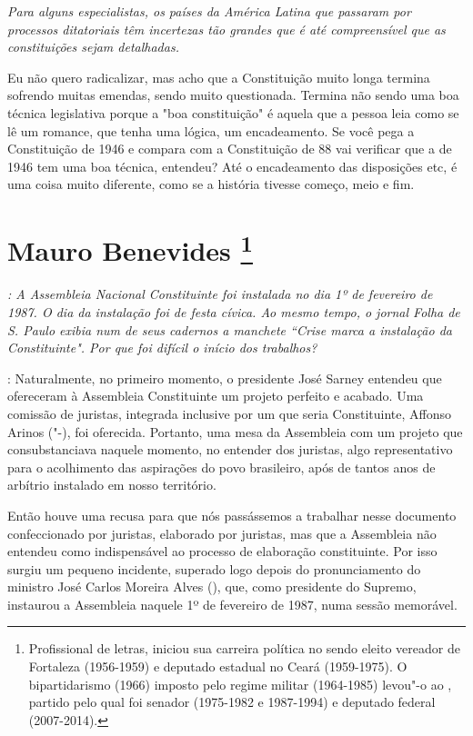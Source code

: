 \medskip

\noindent\emph{Para alguns especialistas, os países da América Latina que
passaram por processos ditatoriais têm incertezas tão grandes que é até
compreensível que as constituições sejam detalhadas.}

Eu não quero radicalizar, mas acho que a Constituição
muito longa termina sofrendo muitas emendas, sendo muito questionada.
Termina não sendo uma boa técnica legislativa porque a "boa
constituição" é aquela que a pessoa leia como se lê um romance, que
tenha uma lógica, um encadeamento. Se você pega a Constituição de 1946 e
compara com a Constituição de 88 vai verificar que a de 1946 tem uma boa
técnica, entendeu? Até o encadeamento das disposições etc, é uma coisa
muito diferente, como se a história tivesse começo, meio e fim.

\chapter{Mauro Benevides
\footnote{Profissional de letras, iniciou sua carreira política no  sendo
eleito vereador de Fortaleza (1956-1959) e deputado estadual no Ceará
(1959-1975). O bipartidarismo (1966) imposto pelo regime militar
(1964-1985) levou"-o ao , partido pelo qual foi senador (1975-1982 e
1987-1994) e deputado federal (2007-2014).}}

\emph{: A Assembleia Nacional Constituinte foi instalada no dia 1º de
fevereiro de 1987. O dia da instalação foi de festa cívica. Ao mesmo
tempo, o jornal Folha de S. Paulo exibia num de seus cadernos a manchete
``Crise marca a instalação da Constituinte". Por que foi difícil o
início dos trabalhos?}

: Naturalmente, no primeiro momento, o presidente José
Sarney entendeu que ofereceram à Assembleia Constituinte um projeto
perfeito e acabado. Uma comissão de juristas, integrada inclusive por um
que seria Constituinte, Affonso Arinos ("-), foi oferecida.
Portanto, uma mesa da Assembleia com um projeto que consubstanciava
naquele momento, no entender dos juristas, algo representativo para o
acolhimento das aspirações do povo brasileiro, após de tantos anos de
arbítrio instalado em nosso território.

Então houve uma recusa para que nós passássemos a trabalhar nesse
documento confeccionado por juristas, elaborado por juristas, mas que a
Assembleia não entendeu como indispensável ao processo de elaboração
constituinte. Por isso surgiu um pequeno incidente, superado logo depois
do pronunciamento do ministro José Carlos Moreira Alves (), que, como
presidente do Supremo, instaurou a Assembleia naquele 1º de fevereiro de
1987, numa sessão memorável.

